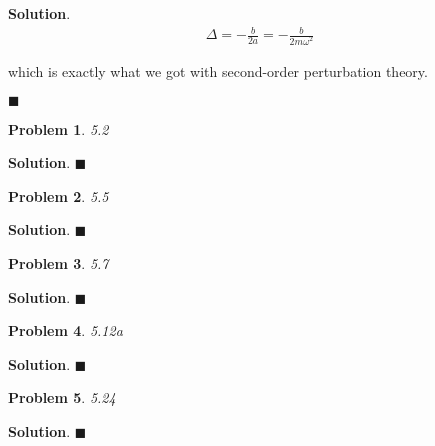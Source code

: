 \documentclass[12pt]{article}
\newtheorem{p}{Problem}
\theoremstyle{definition}
\newenvironment{s}{%
        \begin{trivlist} \item \textbf{Solution}. }{%
            \hspace*{\fill} $\blacksquare$\end{trivlist}}%
\begin{document}
{\begin{s}
\begin{align*}
\Delta = -\frac{b}{2a} = -\frac{b}{2m\omega^{2}}
\end{align*}

which is exactly what we got with second-order perturbation theory.


\end{s}

\begin{p}
5.2
\end{p}

\begin{s}
\end{s}

\begin{p}
5.5
\end{p}

\begin{s}
\end{s}

\begin{p}
5.7
\end{p}

\begin{s}
\end{s}

\begin{p}
5.12a
\end{p}

\begin{s}
\end{s}

\begin{p}
5.24
\end{p}

\begin{s}
\end{s}
\end{document}
